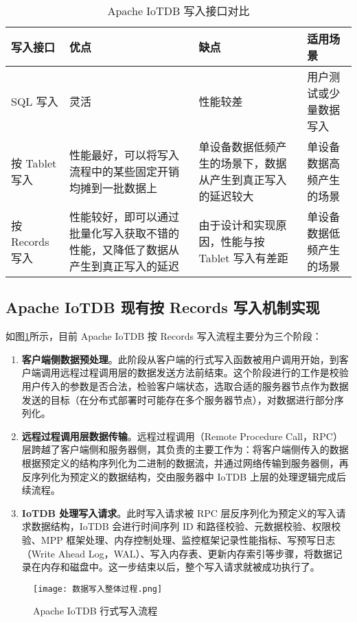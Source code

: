 \begin{table}
  \centering
  \label{tab:iotdbwriteinterfacecompare}
  \caption{Apache IoTDB 写入接口对比}
  \begin{tabular}{lp{3.5cm}p{3.5cm}p{3.5cm}}
    \toprule
    写入接口  & 优点 & 缺点 & 适用场景 \\
    \midrule
    SQL 写入 & 灵活 & 性能较差 & 用户测试或少量数据写入 \\
    按 Tablet 写入  & 性能最好，可以将写入流程中的某些固定开销均摊到一批数据上 & 单设备数据低频产生的场景下，数据从产生到真正写入的延迟较大 & 单设备数据高频产生的场景\\
    按 Records 写入  & 性能较好，即可以通过批量化写入获取不错的性能，又降低了数据从产生到真正写入的延迟 & 由于设计和实现原因，性能与按 Tablet 写入有差距 & 单设备数据低频产生的场景 \\
    \bottomrule
  \end{tabular}
\end{table}

\subsection{Apache IoTDB 现有按 Records 写入机制实现}
如图\ref{fig:iotdb-write-process}所示，目前 Apache IoTDB 按 Records 写入流程主要分为三个阶段：
\begin{enumerate}
  \item \textbf{客户端侧数据预处理}。此阶段从客户端的行式写入函数被用户调用开始，到客户端调用远程过程调用层的数据发送方法前结束。这个阶段进行的工作是校验用户传入的参数是否合法，检验客户端状态，选取合适的服务器节点作为数据发送的目标（在分布式部署时可能存在多个服务器节点），对数据进行部分序列化。
  \item \textbf{远程过程调用层数据传输}。远程过程调用（Remote Procedure Call，RPC）层跨越了客户端侧和服务器侧，其负责的主要工作为：将客户端侧传入的数据根据预定义的结构序列化为二进制的数据流，并通过网络传输到服务器侧，再反序列化为预定义的数据结构，交由服务器中 IoTDB 上层的处理逻辑完成后续流程。
  \item \textbf{IoTDB 处理写入请求}。此时写入请求被 RPC 层反序列化为预定义的写入请求数据结构，IoTDB 会进行时间序列 ID 和路径校验、元数据校验、权限校验、MPP 框架处理、内存控制处理、监控框架记录性能指标、写预写日志（Write Ahead Log，WAL）、写入内存表、更新内存索引等步骤，将数据记录在内存和磁盘中。这一步结束以后，整个写入请求就被成功执行了。
\end{enumerate}
\begin{figure}
  \centering
  \texttt{[image: 数据写入整体过程.png]}
  \caption{Apache IoTDB 行式写入流程}
  \label{fig:iotdb-write-process}
\end{figure}
